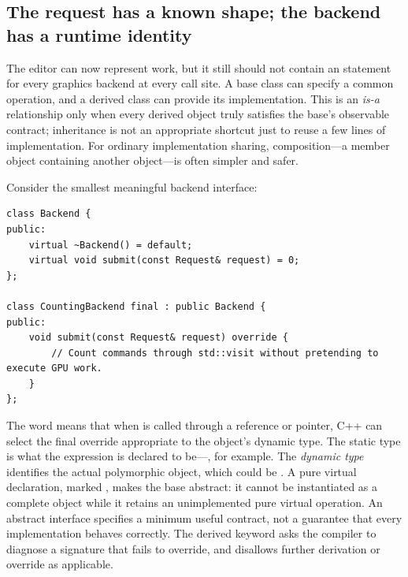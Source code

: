 \subsection{The request has a known shape; the backend has a runtime identity}\label{01-foundations-i-ch004-the-request-has-a-known-shape-the-backend-has-a-runtime-identity}

\hypertarget{01-foundations-i-ch004-the-request-has-a-known-shape-the-backend-has-a-runtime-identity}{}

The editor can now represent work, but it still should not contain an  statement for every graphics backend at every call site. A base class can specify a common operation, and a derived class can provide its implementation. This is an \emph{is-a} relationship only when every derived object truly satisfies the base's observable contract; inheritance is not an appropriate shortcut just to reuse a few lines of implementation. For ordinary implementation sharing, composition---a member object containing another object---is often simpler and safer.

Consider the smallest meaningful backend interface:

\begin{verbatim}
class Backend {
public:
    virtual ~Backend() = default;
    virtual void submit(const Request& request) = 0;
};

class CountingBackend final : public Backend {
public:
    void submit(const Request& request) override {
        // Count commands through std::visit without pretending to execute GPU work.
    }
};
\end{verbatim}

The word  means that when  is called through a  reference or pointer, C++ can select the final override appropriate to the object's dynamic type. The static type is what the expression is declared to be---, for example. The \emph{dynamic type} identifies the actual polymorphic object, which could be . A pure virtual declaration, marked , makes the base abstract: it cannot be instantiated as a complete object while it retains an unimplemented pure virtual operation. An abstract interface specifies a minimum useful contract, not a guarantee that every implementation behaves correctly. The derived  keyword asks the compiler to diagnose a signature that fails to override, and  disallows further derivation or override as applicable.

